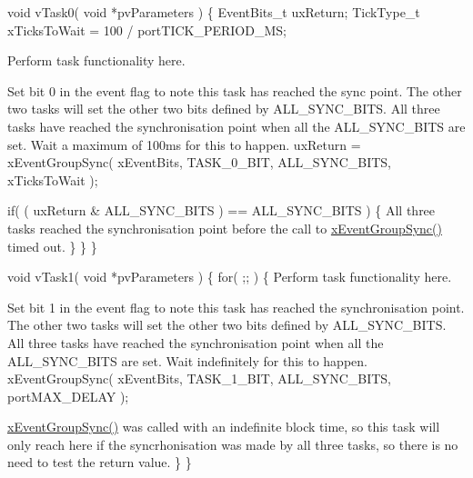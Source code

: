 \begin{DoxyPre} void vTask0( void *pvParameters )
 \{
 EventBits\_t uxReturn;
 TickType\_t xTicksToWait = 100 / portTICK\_PERIOD\_MS;
\begin{DoxyVerb}for( ;; )
{
\end{DoxyVerb}

Perform task functionality here.\end{DoxyPre}



\begin{DoxyPre}Set bit 0 in the event flag to note this task has reached the
sync point.  The other two tasks will set the other two bits defined
by ALL\_SYNC\_BITS.  All three tasks have reached the synchronisation
point when all the ALL\_SYNC\_BITS are set.  Wait a maximum of 100ms
for this to happen.
        uxReturn = xEventGroupSync( xEventBits, TASK\_0\_BIT, ALL\_SYNC\_BITS, xTicksToWait );\end{DoxyPre}



\begin{DoxyPre}        if( ( uxReturn \& ALL\_SYNC\_BITS ) == ALL\_SYNC\_BITS )
        \{
All three tasks reached the synchronisation point before the call
to \hyperlink{event__groups_8h_a869511456b86426f52e2eec898bff341}{xEventGroupSync()} timed out.
        \}
    \}
 \}\end{DoxyPre}



\begin{DoxyPre} void vTask1( void *pvParameters )
 \{
     for( ;; )
     \{
Perform task functionality here.\end{DoxyPre}



\begin{DoxyPre}Set bit 1 in the event flag to note this task has reached the
synchronisation point.  The other two tasks will set the other two
bits defined by ALL\_SYNC\_BITS.  All three tasks have reached the
synchronisation point when all the ALL\_SYNC\_BITS are set.  Wait
indefinitely for this to happen.
        xEventGroupSync( xEventBits, TASK\_1\_BIT, ALL\_SYNC\_BITS, portMAX\_DELAY );\end{DoxyPre}



\begin{DoxyPre}\hyperlink{event__groups_8h_a869511456b86426f52e2eec898bff341}{xEventGroupSync()} was called with an indefinite block time, so
this task will only reach here if the syncrhonisation was made by all
three tasks, so there is no need to test the return value.
     \}
 \}\end{DoxyPre}



